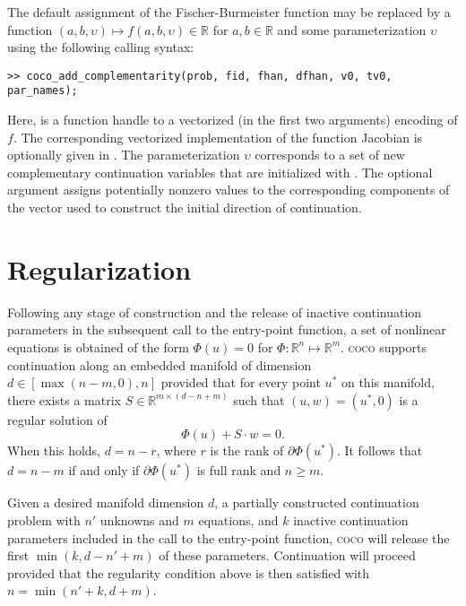 The default assignment of the Fischer-Burmeister function may be replaced by a function $(a,b,\upsilon)\mapsto f(a,b,\upsilon)\in\mathbb{R}$ for $a,b\in\mathbb{R}$ and some parameterization $\upsilon$ using the following calling syntax:
\begin{lstlisting}[language=coco-highlight]
>> coco_add_complementarity(prob, fid, fhan, dfhan, v0, tv0, par_names);
\end{lstlisting}
Here,  is a function handle to a vectorized (in the first two arguments) encoding of $f$. The corresponding vectorized implementation of the function Jacobian is optionally given in . The parameterization $\upsilon$ corresponds to a set of new complementary continuation variables that are initialized with . The optional argument  assigns potentially nonzero values  to the corresponding components of the vector used to construct the initial direction of continuation.

\section{Regularization}

Following any stage of construction and the release of inactive continuation parameters in the subsequent call to the  entry-point function, a set of nonlinear equations is obtained of the form $\Phi(u)=0$ for $\Phi:\mathbb{R}^n\mapsto\mathbb{R}^m$. \textsc{coco} supports continuation along an embedded manifold of dimension $d\in[\max(n-m,0),n]$ provided that for every point $u^\ast$ on this manifold, there exists a matrix $S\in\mathbb{R}^{m\times (d-n+m)}$ such that $(u,w)=(u^\ast,0)$ is a regular solution of
\begin{equation}
\label{eq:regular}
\Phi(u)+S\cdot w=0.
\end{equation}
When this holds, $d=n-r$, where $r$ is the rank of $\partial\Phi(u^*)$. It follows that $d=n-m$ if and only if $\partial\Phi(u^*)$ is full rank and $n\ge m$.

Given a desired manifold dimension $d$, a partially constructed continuation problem with $n'$ unknowns and $m$ equations, and $k$ inactive continuation parameters included in the call to the  entry-point function, \textsc{coco} will release the first $\min(k,d-n'+m)$ of these parameters. Continuation will proceed provided that the regularity condition above is then satisfied with $n=\min(n'+k,d+m)$.

